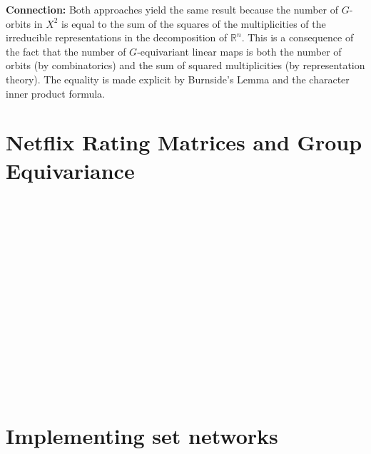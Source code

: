 \documentclass[11pt]{article}
\begin{document}
\textbf{Connection:} Both approaches yield the same result because the number of $G$-orbits in $X^2$ is equal to the sum of the squares of the multiplicities of the irreducible representations in the decomposition of $\mathbb{R}^n$. This is a consequence of the fact that the number of $G$-equivariant linear maps is both the number of orbits (by combinatorics) and the sum of squared multiplicities (by representation theory). The equality is made explicit by Burnside's Lemma and the character inner product formula.


\section{Netflix Rating Matrices and Group Equivariance}

\subsection{~}
\subsection{~}
\subsection{~}
\subsection{~}
\subsection{~}


\section{Implementing set networks}

\subsection{~}
\subsection{~}
\subsection{~}
\subsection{~}
\end{document}
